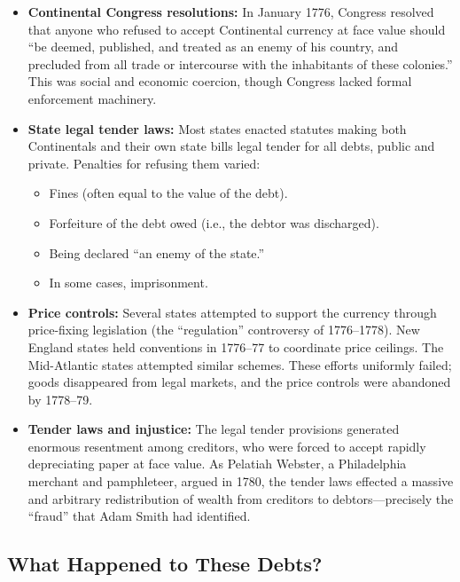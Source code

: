 \documentclass[12pt]{article}
\begin{document}
\begin{itemize}
    \item \textbf{Continental Congress resolutions:} In January 1776, Congress
    resolved that anyone who refused to accept Continental currency at face
    value should ``be deemed, published, and treated as an enemy of his
    country, and precluded from all trade or intercourse with the inhabitants
    of these colonies.''  This was social and economic coercion, though Congress
    lacked formal enforcement machinery.

    \item \textbf{State legal tender laws:} Most states enacted statutes making
    both Continentals and their own state bills legal tender for all debts,
    public and private.  Penalties for refusing them varied:
    \begin{itemize}[nosep]
        \item Fines (often equal to the value of the debt).
        \item Forfeiture of the debt owed (i.e., the debtor was discharged).
        \item Being declared ``an enemy of the state.''
        \item In some cases, imprisonment.
    \end{itemize}

    \item \textbf{Price controls:} Several states attempted to support the
    currency through price-fixing legislation (the ``regulation'' controversy
    of 1776--1778).  New England states held conventions in 1776--77 to
    coordinate price ceilings.  The Mid-Atlantic states attempted similar
    schemes.  These efforts uniformly failed; goods disappeared from legal
    markets, and the price controls were abandoned by 1778--79.

    \item \textbf{Tender laws and injustice:} The legal tender provisions
    generated enormous resentment among creditors, who were forced to accept
    rapidly depreciating paper at face value.  As Pelatiah Webster, a
    Philadelphia merchant and pamphleteer, argued in 1780, the tender laws
    effected a massive and arbitrary redistribution of wealth from creditors to
    debtors---precisely the ``fraud'' that Adam Smith had identified.
\end{itemize}

\subsection{What Happened to These Debts?}
\end{document}
